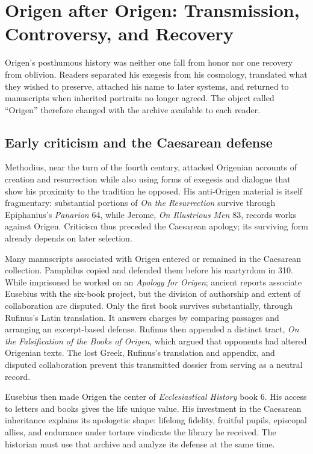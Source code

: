 \section{Origen after Origen: Transmission, Controversy, and Recovery}
\label{sec:origen-reception}

Origen's posthumous history was neither one fall from honor nor one recovery
from oblivion. Readers separated his exegesis from his cosmology, translated
what they wished to preserve, attached his name to later systems, and returned
to manuscripts when inherited portraits no longer agreed. The object called
``Origen'' therefore changed with the archive available to each reader.

\subsection{Early criticism and the Caesarean defense}

Methodius, near the turn of the fourth century, attacked Origenian accounts of
creation and resurrection while also using forms of exegesis and dialogue that
show his proximity to the tradition he opposed. His anti-Origen material is
itself fragmentary: substantial portions of \emph{On the Resurrection} survive
through Epiphanius's \emph{Panarion} 64, while Jerome, \emph{On Illustrious
Men} 83, records works against Origen. Criticism thus preceded the Caesarean
apology; its surviving form already depends on later selection.

Many manuscripts associated with Origen entered or remained in the Caesarean
collection. Pamphilus copied and defended them
before his martyrdom in 310. While imprisoned he worked on an \emph{Apology for
Origen}; ancient reports associate Eusebius with the six-book project, but the
division of authorship and extent of collaboration are disputed. Only the first
book survives substantially, through Rufinus's Latin translation. It answers
charges by comparing passages and arranging an excerpt-based defense. Rufinus
then appended a distinct tract, \emph{On the Falsification of the Books of
Origen}, which argued that opponents had altered Origenian texts. The lost
Greek, Rufinus's translation and appendix, and disputed collaboration prevent
this transmitted dossier from serving as a neutral record.

Eusebius then made Origen the center of \emph{Ecclesiastical History} book 6.
His access to letters and books gives the life unique value. His investment in
the Caesarean inheritance explains its apologetic shape: lifelong fidelity,
fruitful pupils, episcopal allies, and endurance under torture vindicate the
library he received. The historian must use that archive and analyze its
defense at the same time.

